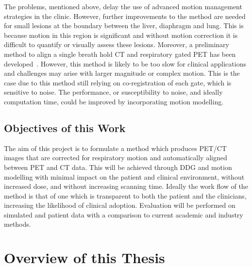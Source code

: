         The problems, mentioned above, delay the use of advanced motion management strategies in the clinic. However, further improvements to the method are needed for small lesions at the boundary between the liver, diaphragm and lung. This is because motion in this region is significant and without motion correction it is difficult to quantify or visually assess these lesions. Moreover, a preliminary method to align a single breath hold \gls{CT} and respiratory gated \gls{PET} has been developed~\parencite{Bousse2016a, Bousse2016}. However, this method is likely to be too slow for clinical applications and challenges may arise with larger magnitude or complex motion. This is the case due to this method still relying on co-registration of each gate, which is sensitive to noise. The performance, or susceptibility to noise, and ideally computation time, could be improved by incorporating motion modelling. 
            
        \subsection{Objectives of this Work} \label{sec:objectives_of_this_work}
            The aim of this project is to formulate a method which produces \gls{PET}/\gls{CT} images that are corrected for respiratory motion and automatically aligned between \gls{PET} and \gls{CT} data. This will be achieved through \gls{DDG} and motion modelling %
            with minimal impact on the patient and clinical environment, without increased dose, and without increasing scanning time. Ideally the work flow of the method is that of one which is transparent to both the patient and the clinicians, increasing the likelihood of clinical adoption. Evaluation will be performed on simulated and patient data with a comparison to current academic and industry methods.
        
    \section{Overview of this Thesis} \label{sec:overview_of_this_thesis}
        
